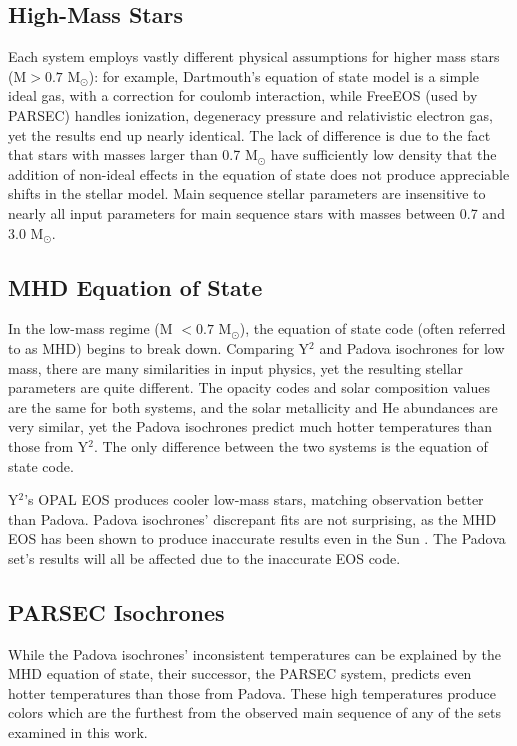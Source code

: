 \documentclass[iop]{emulateapj}
\begin{document}
\subsection{High-Mass Stars}
Each system employs vastly different physical assumptions for higher mass stars (M$>0.7$ M$_\odot$): for example, Dartmouth's equation of state model is a simple ideal gas, with a correction for coulomb interaction, while FreeEOS (used by PARSEC) handles ionization, degeneracy pressure and relativistic electron gas, yet the results end up nearly identical. The lack of difference is due to the fact that stars with masses larger than 0.7 M$_\odot$ have sufficiently low density that the addition of non-ideal effects in the equation of state does not produce appreciable shifts in the stellar model. Main sequence stellar parameters are insensitive to nearly all input parameters for main sequence stars with masses between 0.7 and 3.0 M$_\odot$.


\subsection{MHD Equation of State}
In the low-mass regime (M $<0.7$ M$_\odot$), the \citet{1990ApJ...350..300M} equation of state code (often referred to as MHD) begins to break down. Comparing Y$^2$ and Padova isochrones for low mass, there are many similarities in input physics, yet the resulting stellar parameters are quite different. The opacity codes and solar composition values are the same for both systems, and the solar metallicity and He abundances are very similar, yet the Padova isochrones predict much hotter temperatures than those from Y$^2$. The only difference between the two systems is the equation of state code.

Y$^2$'s OPAL EOS \citep{1996ApJ...456..902R} produces cooler low-mass stars, matching observation better than Padova. Padova isochrones' discrepant fits are not surprising, as the MHD EOS has been shown to produce inaccurate results even in the Sun \citep{1992AcA....42....5D}. The Padova set's results will all be affected due to the inaccurate EOS code.


\subsection{PARSEC Isochrones}
While the Padova isochrones' inconsistent temperatures can be explained by the MHD equation of state, their successor, the PARSEC system, predicts even hotter temperatures than those from Padova. These high temperatures produce colors which are the furthest from the observed main sequence of any of the sets examined in this work.
\end{document}
